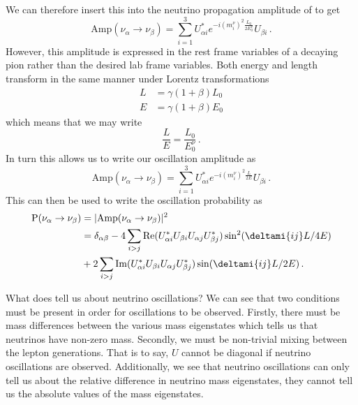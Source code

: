 We can therefore insert this into the neutrino propagation amplitude of  to get
\begin{equation}
  \text{Amp}(\nu_{\alpha} \rightarrow \nu_{\beta}) = \sum_{i=1}^{3} U_{\alpha i}^{*} e^{ -i(m_{i}^{\nu})^{2}\frac{L_{0}}{2E^{\nu}_{0}} } U_{\beta i} \, .
\end{equation}
However, this amplitude is expressed in the rest frame variables of a decaying pion rather than the desired lab frame variables.
Both energy and length transform in the same manner under Lorentz transformations
\begin{align}
  L &= \gamma (1 + \beta) L_{0} \\
  E &= \gamma (1 + \beta) E_{0}
\end{align}
which means that we may write
\begin{equation}
\frac{L}{E} = \frac{L_{0}}{E_{0}^{\nu}} \, .
\end{equation}
In turn this allows us to write our oscillation amplitude as
\begin{equation}
  \text{Amp}(\nu_{\alpha} \rightarrow \nu_{\beta}) = \sum_{i=1}^{3} U_{\alpha i}^{*} e^{ -i(m_{i}^{\nu})^{2}\frac{L}{2E} } U_{\beta i} \, .
\end{equation}
This can then be used to write the oscillation probability as
\begin{align}
\begin{split}
  \text{P}(\nu_{\alpha} \rightarrow \nu_{\beta}) &= | \text{Amp}(\nu_{\alpha} \rightarrow \nu_{\beta}) |^{2} \\
  &= \delta_{\alpha \beta} - 4 \sum_{i > j} \text{Re}( U^{*}_{\alpha i} U_{\beta i} U_{\alpha j} U^{*}_{\beta j} ) \sin^{2}(\deltami{ij}L/4E) \\
  & + 2 \sum_{i>j} \text{Im}( U^{*}_{\alpha i} U_{\beta i} U_{\alpha j} U^{*}_{\beta j} ) \sin (\deltami{ij}L/2E) \, .
  \label{eq:oscProbAllOut}
\end{split}
\end{align}

What does  tell us about neutrino oscillations?
We can see that two conditions must be present in order for oscillations to be observed.
Firstly, there must be mass differences between the various mass eigenstates which tells us that neutrinos have non-zero mass.
Secondly, we must be non-trivial mixing between the lepton generations.
That is to say, $U$ cannot be diagonal if neutrino oscillations are observed.
Additionally, we see that neutrino oscillations can only tell us about the relative difference in neutrino mass eigenstates, they cannot tell us the absolute values of the mass eigenstates.

